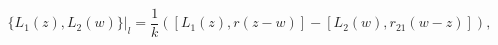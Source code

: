 \begin{equation}
\{L_1(z),L_2(w)\}\Big|_{l}=\frac1k([L_1(z),r(z-w)]-
[L_2(w),r_{21}(w-z)]),
\label{Llin}
\end{equation}

